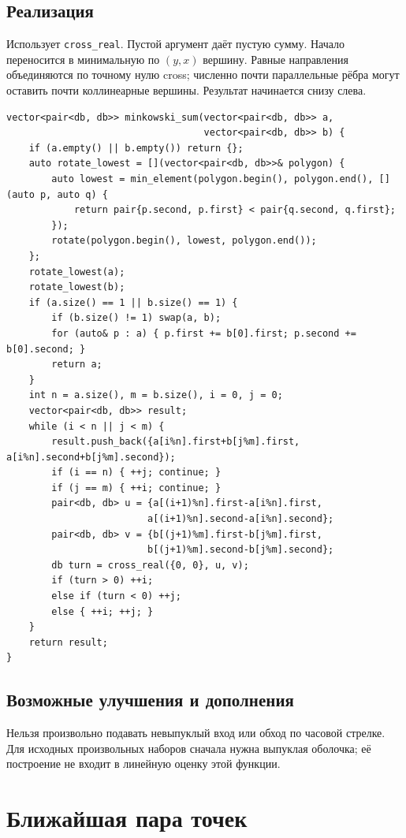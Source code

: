 \subsection*{Реализация}
Использует \texttt{cross\_real}. Пустой аргумент даёт пустую сумму.
Начало переносится в минимальную по $(y,x)$ вершину. Равные направления
объединяются по точному нулю cross; численно почти параллельные рёбра
могут оставить почти коллинеарные вершины. Результат начинается снизу слева.
\begin{lstlisting}[name=geometry_minkowski]
vector<pair<db, db>> minkowski_sum(vector<pair<db, db>> a,
                                   vector<pair<db, db>> b) {
    if (a.empty() || b.empty()) return {};
    auto rotate_lowest = [](vector<pair<db, db>>& polygon) {
        auto lowest = min_element(polygon.begin(), polygon.end(), [](auto p, auto q) {
            return pair{p.second, p.first} < pair{q.second, q.first};
        });
        rotate(polygon.begin(), lowest, polygon.end());
    };
    rotate_lowest(a);
    rotate_lowest(b);
    if (a.size() == 1 || b.size() == 1) {
        if (b.size() != 1) swap(a, b);
        for (auto& p : a) { p.first += b[0].first; p.second += b[0].second; }
        return a;
    }
    int n = a.size(), m = b.size(), i = 0, j = 0;
    vector<pair<db, db>> result;
    while (i < n || j < m) {
        result.push_back({a[i%n].first+b[j%m].first, a[i%n].second+b[j%m].second});
        if (i == n) { ++j; continue; }
        if (j == m) { ++i; continue; }
        pair<db, db> u = {a[(i+1)%n].first-a[i%n].first,
                         a[(i+1)%n].second-a[i%n].second};
        pair<db, db> v = {b[(j+1)%m].first-b[j%m].first,
                         b[(j+1)%m].second-b[j%m].second};
        db turn = cross_real({0, 0}, u, v);
        if (turn > 0) ++i;
        else if (turn < 0) ++j;
        else { ++i; ++j; }
    }
    return result;
}
\end{lstlisting}
\subsection*{Возможные улучшения и дополнения}
Нельзя произвольно подавать невыпуклый вход или обход по часовой стрелке.
Для исходных произвольных наборов сначала нужна выпуклая оболочка;
её построение не входит в линейную оценку этой функции.


\fi
\iffalse
\section{Ближайшая пара точек}
